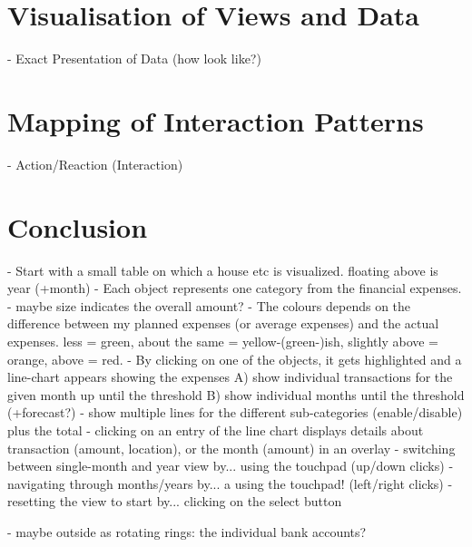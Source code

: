\section{Visualisation of Views and Data}

- Exact Presentation of Data (how look like?)



\section{Mapping of Interaction Patterns}

- Action/Reaction (Interaction)





\section{Conclusion}




- Start with a small table on which a house etc is visualized. floating above is year (+month)
- Each object represents one category from the financial expenses.
- maybe size indicates the overall amount?
- The colours depends on the difference between my planned expenses (or average expenses) and the actual expenses. less = green, about the same = yellow-(green-)ish, slightly above = orange, above = red.
- By clicking on one of the objects, it gets highlighted and a line-chart appears showing the expenses
   A) show individual transactions for the given month up until the threshold
   B) show individual months until the threshold (+forecast?)
- show multiple lines for the different sub-categories (enable/disable) plus the total
- clicking on an entry of the line chart displays details about transaction (amount, location), or the month (amount) in an overlay
- switching between single-month and year view by... using the touchpad (up/down clicks)
- navigating through months/years by... a using the touchpad! (left/right clicks)
- resetting the view to start by... clicking on the select button

- maybe outside as rotating rings: the individual bank accounts?

